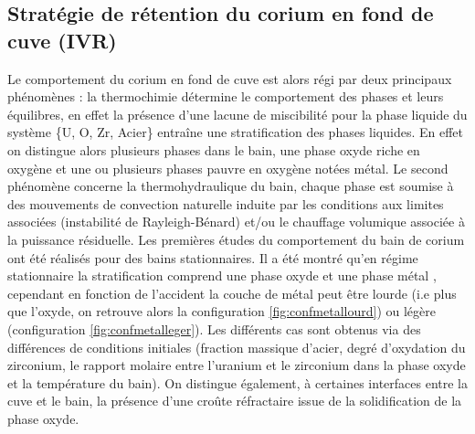 \subsection{Stratégie de rétention du corium en fond de cuve (IVR)}
Le comportement du corium en fond de cuve est alors régi par deux principaux phénomènes \cite{shams_status_2020} : 
la thermochimie détermine le comportement des phases et leurs équilibres, en effet la présence d'une lacune de miscibilité pour la phase liquide du système \{U, O, Zr, Acier\} entraîne une stratification des phases liquides. En effet on distingue alors plusieurs phases dans le bain, une phase oxyde riche en oxygène et une ou plusieurs phases pauvre en oxygène notées métal. Le second phénomène concerne la thermohydraulique du bain, chaque phase est soumise à des mouvements de convection naturelle induite par les conditions aux limites associées (instabilité de Rayleigh-Bénard) et/ou le chauffage volumique associée à la puissance résiduelle.
Les premières études du comportement du bain de corium ont été réalisés pour des bains stationnaires. Il a été montré qu'en régime stationnaire la stratification comprend une phase oxyde et une phase métal \cite{theofanous_-vessel_1997}, cependant en fonction de l'accident la couche de métal peut être lourde (i.e plus que l'oxyde, on retrouve alors la configuration \ref{fig:confmetallourd}) ou légère (configuration \ref{fig:confmetalleger}). Les différents cas sont obtenus via des différences de conditions initiales (fraction massique d'acier, degré d'oxydation du zirconium, le rapport molaire entre l'uranium et le zirconium dans la phase oxyde et la température du bain). On distingue également, à certaines interfaces entre la cuve et le bain, la présence d'une croûte réfractaire issue de la solidification de la phase oxyde.
